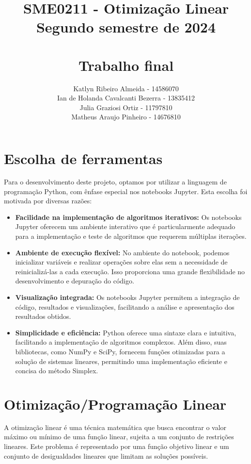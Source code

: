 \documentclass{article}
\title{SME0211 - Otimização Linear\\
Segundo semestre de 2024\\ 

\textbf{\\Trabalho final}}
\author{
Katlyn Ribeiro Almeida - 14586070\\
Ian de Holanda Cavalcanti Bezerra - 13835412 \\
Julia Graziosi Ortiz - 11797810\\
Matheus Araujo Pinheiro - 14676810
}
\begin{document}
\maketitle
\section{Escolha de ferramentas}

Para o desenvolvimento deste projeto, optamos por utilizar a linguagem de programação Python, com ênfase especial nos notebooks Jupyter. Esta escolha foi motivada por diversas razões:

\begin{itemize}
    \item \textbf{Facilidade na implementação de algoritmos iterativos:} Os notebooks Jupyter oferecem um ambiente interativo que é particularmente adequado para a implementação e teste de algoritmos que requerem múltiplas iterações.
    
    \item \textbf{Ambiente de execução flexível:} No ambiente do notebook, podemos inicializar variáveis e realizar operações sobre elas sem a necessidade de reinicializá-las a cada execução. Isso proporciona uma grande flexibilidade no desenvolvimento e depuração do código.
    
    \item \textbf{Visualização integrada:} Os notebooks Jupyter permitem a integração de código, resultados e visualizações, facilitando a análise e apresentação dos resultados obtidos.
    
    \item \textbf{Simplicidade e eficiência:} Python oferece uma sintaxe clara e intuitiva, facilitando a implementação de algoritmos complexos. Além disso, suas bibliotecas, como NumPy e SciPy, fornecem funções otimizadas para a solução de sistemas lineares, permitindo uma implementação eficiente e concisa do método Simplex.
\end{itemize}


\section{Otimização/Programação Linear}

A otimização linear é uma técnica matemática que busca encontrar o valor máximo ou mínimo de uma função linear, sujeita a um conjunto de restrições lineares. Este problema é representado por uma função objetivo linear e um conjunto de desigualdades lineares que limitam as soluções possíveis.
\end{document}
